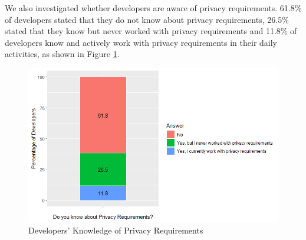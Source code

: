 \documentclass[conference]{IEEEtran}
\begin{document}

We also investigated whether developers are aware of privacy requirements. 61.8\% of developers stated that they do not know about privacy requirements, 26.5\% stated that they know but never worked with privacy requirements and 11.8\% of developers know and actively work with privacy requirements in their daily activities, as shown in Figure \ref{fig:know}. %

\begin{figure}[!htb]
    \centering
    \includegraphics[width=5.5in]{Figures/RQ14.png}
    \caption{Developers' Knowledge of Privacy Requirements}
    \label{fig:know}
\end{figure}
\end{document}
